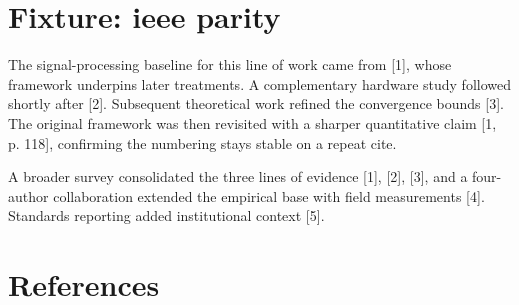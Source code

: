 

\hypertarget{fixture-ieee-parity}{%
\section{Fixture: ieee parity}\label{fixture-ieee-parity}}

The signal-processing baseline for this line of work came from {[}1{]},
whose framework underpins later treatments. A complementary hardware
study followed shortly after {[}2{]}. Subsequent theoretical work
refined the convergence bounds {[}3{]}. The original framework was then
revisited with a sharper quantitative claim {[}1, p. 118{]}, confirming
the numbering stays stable on a repeat cite.

A broader survey consolidated the three lines of evidence {[}1{]},
{[}2{]}, {[}3{]}, and a four-author collaboration extended the empirical
base with field measurements {[}4{]}. Standards reporting added
institutional context {[}5{]}.

\hypertarget{bibliography}{%
\section*{References}\label{bibliography}}

